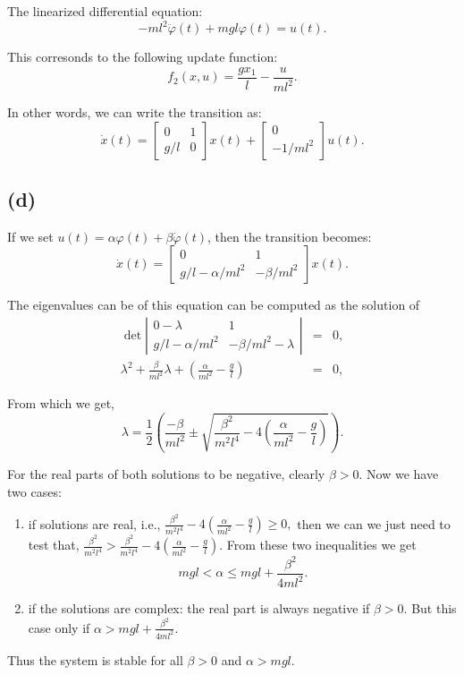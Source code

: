 \documentclass{article}
\begin{document}
The linearized differential equation:
$$-ml^2 \ddot {\varphi} (t) + mgl \varphi(t) = u(t).$$

This corresonds to the following update function:
$$ f_2 (x,u) = \frac{gx_1}{l} - \frac{u}{ml^2}.$$


In other words, we can write the transition as:
$$ \dot{x}(t) = \left[ \begin{array}{cc} 
0 & 1\\
g/l & 0
\end{array} \right] x(t) + \left[\begin{array}{cc}
 0 \\
-1/ml^2
\end{array}\right] u(t)
.$$


\subsection*{(d)}

If we set $u(t) = \alpha \varphi(t) + \beta \dot{\varphi}(t)$, then
the transition  becomes:
$$ \dot{x}(t) = \left[ \begin{array}{cc} 
0 & 1\\
g/l - \alpha/ml^2 & -\beta/ml^2
\end{array} \right] x(t).$$

The eigenvalues can be of this equation can be computed as the
solution of 
\begin{eqnarray}
 \det\left| \begin{array}{cc} 
0 - \lambda & 1\\
g/l - \alpha/ml^2 & -\beta/ml^2-\lambda 
\end{array} \right| &=& 0, \\
 \lambda^2 + \frac{\beta}{ml^2}\lambda   +
 \left(\frac{\alpha}{ml^2} - \frac{g}{l}\right) &=& 0,
\end{eqnarray}

From which we get, 
$$\lambda = \frac{1}{2} \left(\frac{-\beta}{ml^2} \pm \sqrt {\frac{\beta^2}{m^2l^4}
 - 4 \left(\frac{\alpha}{ml^2} - \frac{g}{l}\right)}\right).$$


For the real parts of both solutions to be negative, clearly $\beta >
0$. Now we have two cases:
\begin{enumerate}
\item if solutions are real, i.e., 
$  \frac{\beta^2}{m^2l^4}
 - 4 \left(\frac{\alpha}{ml^2} - \frac{g}{l}\right) \ge 0,$ then we
   can we just need to test that, $\frac{\beta^2}{m^2l^4} >  \frac{\beta^2}{m^2l^4}
 - 4 \left(\frac{\alpha}{ml^2} - \frac{g}{l}\right)$. From these two
 inequalities we get
    $$  mgl <\alpha \le mgl + \frac{\beta^2}{4ml^2} .$$

\item if the solutions are complex:  the real part is always
  negative if $\beta > 0$. But this case only if $\alpha  > mgl +
  \frac{\beta^2}{4ml^2}$.
\end{enumerate}

Thus the system is stable for all $\beta > 0$ and $\alpha > mgl$.
\end{document}
